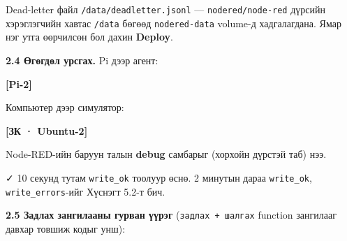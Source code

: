 Dead-letter файл \texttt{/\allowbreak{}data/\allowbreak{}deadletter.\allowbreak{}jsonl} --- \texttt{nodered/node-red} дүрсийн хэрэглэгчийн хавтас \texttt{/data} бөгөөд \texttt{nodered-data} volume-д хадгалагдана. Ямар нэг утга өөрчилсөн бол дахин \textbf{Deploy}.

\textbf{2.4 Өгөгдөл урсгах.} Pi дээр агент:

\textbf{{[}Pi-2{]}}

\begin{Shaded}
\begin{Highlighting}[]
\KeywordTok{\&\&} 
\end{Highlighting}
\end{Shaded}

Компьютер дээр симулятор:

\textbf{{[}ЗК · Ubuntu-2{]}}

\begin{Shaded}
\begin{Highlighting}[]
\end{Highlighting}
\end{Shaded}

Node-RED-ийн баруун талын \textbf{debug} самбарыг (хорхойн дүрстэй таб) нээ.

✓ 10 секунд тутам \texttt{write\_ok} тоолуур өснө. 2 минутын дараа \texttt{write\_ok}, \texttt{write\_errors}-ийг Хүснэгт 5.2-т бич.

\textbf{2.5 Задлах зангилааны гурван үүрэг} (\texttt{задлах\ +\ шалгах} function зангилааг давхар товшиж кодыг унш):


